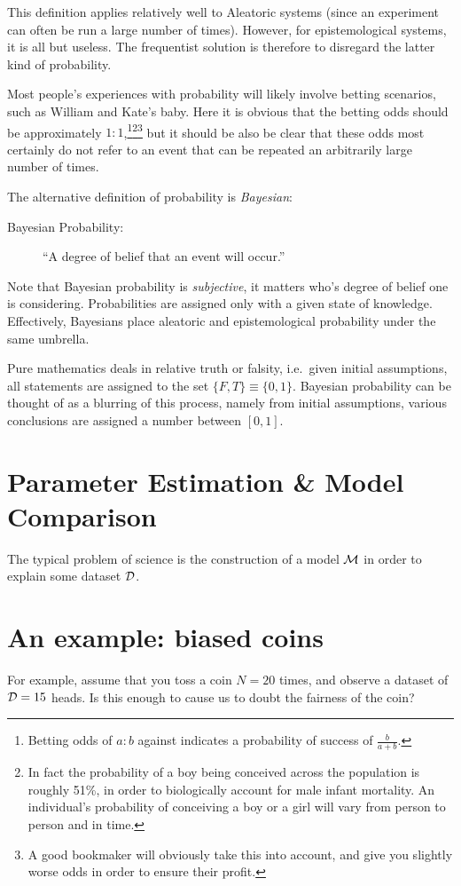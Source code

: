 This definition applies relatively well to Aleatoric systems (since an experiment can often be run a large number of times). However, for epistemological systems, it is all but useless. The frequentist solution is therefore to disregard the latter kind of probability.

Most people's experiences with probability will likely involve betting scenarios, such as William and Kate's baby. Here it is obvious that the betting odds should be approximately $1:1$,\footnote{Betting odds of $a:b$ against indicates a probability of success of $\frac{b}{a+b}$.}\footnote{In fact the probability of a boy being conceived across the population is roughly 51\%, in order to biologically account for male infant mortality. An individual's probability of conceiving a boy or a girl will vary from person to person and in time.}\footnote{A good bookmaker will obviously take this into account, and give you slightly worse odds in order to ensure their profit.} but it should be also be clear that these odds most certainly do not refer to an event that can be repeated an arbitrarily large number of times.

The alternative definition of probability is {\em Bayesian\/}:
\begin{description}
  \item[Bayesian Probability:] ``A degree of belief that an event will occur.'' 
\end{description}
Note that Bayesian probability is {\em subjective}, it matters who's degree of belief one is considering. Probabilities are assigned only with a given state of knowledge. Effectively, Bayesians place aleatoric and epistemological probability under the same umbrella. 

Pure mathematics deals in relative truth or falsity, i.e.\ given initial assumptions, all statements are assigned to the set $\{F,T\}\equiv\{0,1\}$. Bayesian probability can be thought of as a blurring of this process, namely from initial assumptions, various conclusions are assigned a number between $[0,1]$.

\section{Parameter Estimation \& Model Comparison}
\label{sec:bay:model_comp}
The typical problem of science is the construction of a model $\mathcal{M}$ in order to explain some dataset $\mathcal{D}$. 


\section{An example: biased coins}
For example, assume that you toss a coin $N=20$ times, and observe a dataset of $\mathcal{D} = 15$ heads. Is this enough to cause us to doubt the fairness of the coin?

